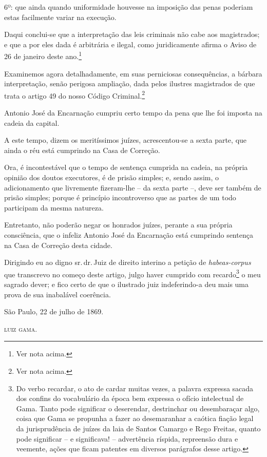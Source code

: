6º: que ainda quando uniformidade houvesse na imposição das penas
poderiam estas facilmente variar na execução.

Daqui conclui-se que a interpretação das leis criminais não cabe aos
magistrados; e que a por eles dada é arbitrária e ilegal, como
juridicamente afirma o Aviso de 26 de janeiro deste ano.\footnote{Ver
  nota acima.}

Examinemos agora detalhadamente, em suas perniciosas consequências, a
bárbara interpretação, senão perigosa ampliação, dada pelos ilustres
magistrados de que trata o artigo 49 do nosso Código
Criminal.\footnote{Ver nota acima.}

Antonio José da Encarnação cumpriu certo tempo da pena que lhe foi
imposta na cadeia da capital.

A este tempo, dizem os meritíssimos juízes, acrescentou-se a sexta
parte, que ainda o réu está cumprindo na Casa de Correção.

Ora, é incontestável que o tempo de sentença cumprida na cadeia, na
própria opinião dos doutos executores, é de prisão simples; e, sendo
assim, o adicionamento que livremente fizeram-lhe -- da sexta parte --,
deve ser também de prisão simples; porque é princípio incontroverso que
as partes de um todo participam da mesma natureza.

Entretanto, não poderão negar os honrados juízes, perante a sua própria
consciência, que o infeliz Antonio José da Encarnação está cumprindo
sentença na Casa de Correção desta cidade.

Dirigindo eu ao digno sr.\,dr.\,Juiz de direito interino a petição de
\emph{habeas-corpus} que transcrevo no começo deste artigo, julgo haver
cumprido com recardo\footnote{Do verbo recardar, o ato de cardar
  muitas vezes, a palavra expressa sacada dos confins do vocabulário da
  época bem expressa o ofício intelectual de Gama. Tanto pode significar
  o deserendar, destrinchar ou desembaraçar algo, coisa que Gama se
  propunha a fazer ao desemaranhar a caótica fiação legal da
  jurisprudência de juízes da laia de Santos Camargo e Rego Freitas,
  quanto pode significar -- e significava! -- advertência ríspida,
  repreensão dura e veemente, ações que ficam patentes em diversos
  parágrafos desse artigo.} o meu sagrado dever; e fico certo de que o
ilustrado juiz indeferindo-a deu mais uma prova de sua inabalável
coerência.
\begin{flushright}
São Paulo, 22 de julho de 1869.

\textsc{luiz gama}.
\end{flushright}

